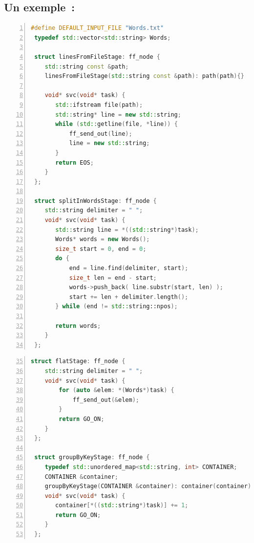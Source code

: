 \subsection{Un exemple~: }


\begin{lstlisting}[language=c++, 
caption={Le code source FastFlow d'une application de d\'ecompte du nombre d'occurrences des mots.},
label={wordcountFastFlow},
frame=single,
float,
numbers=left
]
 #define DEFAULT_INPUT_FILE "Words.txt"
 typedef std::vector<std::string> Words;
 
 struct linesFromFileStage: ff_node {
    std::string const &path;
    linesFromFileStage(std::string const &path): path(path){}
 
    void* svc(void* task) {
       std::ifstream file(path);
       std::string* line = new std::string;
       while (std::getline(file, *line)) {
           ff_send_out(line);
           line = new std::string;
       }
       return EOS;
    }
 };
 
 struct splitInWordsStage: ff_node {
    std::string delimiter = " ";
    void* svc(void* task) {
       std::string line = *((std::string*)task);
       Words* words = new Words();
       size_t start = 0, end = 0;
       do {
           end = line.find(delimiter, start);
           size_t len = end - start;
           words->push_back( line.substr(start, len) );
           start += len + delimiter.length();
       } while (end != std::string::npos);

       return words;
    }
 };
\end{lstlisting}
 
\begin{lstlisting}[language=c++, frame=single,float,numbers=left,firstnumber=35]
 struct flatStage: ff_node {
    std::string delimiter = " ";
    void* svc(void* task) {
        for (auto &elem: *(Words*)task) {
            ff_send_out(&elem);
        }
        return GO_ON;
    }
 };
 
 struct groupByKeyStage: ff_node {
    typedef std::unordered_map<std::string, int> CONTAINER;
    CONTAINER &container;
    groupByKeyStage(CONTAINER &container): container(container){}
    void* svc(void* task) {
       container[*((std::string*)task)] += 1;
       return GO_ON;
    }
 };
\end{lstlisting}
 
